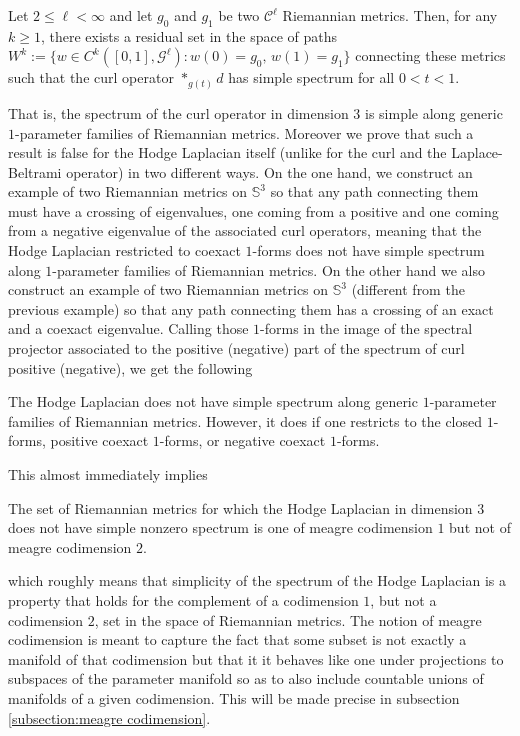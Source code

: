 \begin{thm}
\label{theorem:main}
    Let $2\leq \ell<\infty$ and let $g_0$ and $g_1$ be two $\mathcal{C}^\ell$ Riemannian metrics. Then, for any $k\geq 1$, there exists a residual set in the space of paths $W^k:=\{w\in C^k([0,1],\mathcal{G}^\ell):w(0)=g_0, \,w(1)=g_1\}$ connecting these metrics such that the curl operator $\ast_{g(t)}d$ has simple spectrum for all $0<t<1$. 
\end{thm}
That is, the spectrum of the curl operator in dimension $3$ is simple along generic $1$-parameter families of Riemannian metrics. Moreover we prove that such a result is false for the Hodge Laplacian itself (unlike for the curl and the Laplace-Beltrami operator) in two different ways. On the one hand, we construct an example of two Riemannian metrics on $\mathbb{S}^3$ so that any path connecting them must have a crossing of eigenvalues, one coming from a positive and one coming from a negative eigenvalue of the associated curl operators, meaning that the Hodge Laplacian restricted to coexact $1$-forms does not have simple spectrum along $1$-parameter families of Riemannian metrics. On the other hand we also construct an example of two Riemannian metrics on $\mathbb{S}^3$ (different from the previous example) so that any path connecting them has a crossing of an exact and a coexact eigenvalue.
Calling those $1$-forms in the image of the spectral projector associated to the positive (negative) part of the spectrum of curl positive (negative), we get the following

\begin{thm}
    \label{theorem: Hodge Laplacian 1-parameter genericity}
    The Hodge Laplacian does not have simple spectrum along generic $1$-parameter families of Riemannian metrics. However, it does if one restricts to the closed $1$-forms, positive coexact $1$-forms, or negative coexact $1$-forms.
\end{thm}


This almost immediately implies 

\begin{cor}
\label{cor: meagre one but not two}
    The set of Riemannian metrics for which the Hodge Laplacian in dimension $3$ does not have simple nonzero spectrum is one of meagre codimension $1$ but not of meagre codimension $2$.
\end{cor}

which roughly means that simplicity of the spectrum of the Hodge Laplacian is a property that holds for the complement of a codimension $1$, but not a codimension $2$, set in the space of Riemannian metrics. The notion of meagre codimension is meant to capture the fact that some subset is not exactly a manifold of that codimension but that it it behaves like one under projections to subspaces of the parameter manifold so as to also include countable unions of manifolds of a given codimension. This will be made precise in subsection \ref{subsection:meagre codimension}.\par

